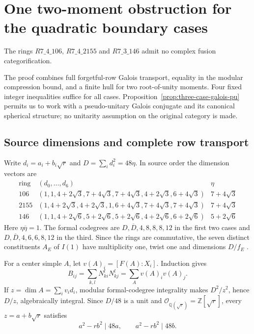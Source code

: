 \section{One two-moment obstruction for the quadratic boundary cases}
\label{sec:quadratic-center-trace}

\begin{theorem}\label{thm:quadratic-center-trace}
The rings $R7\_4\_106$, $R7\_4\_2155$ and $R7\_3\_146$
admit no complex fusion categorification.
\end{theorem}

The proof combines full forgetful-row Galois transport, equality in the
modular compression bound, and a finite hull for two root-of-unity
moments. Four fixed integer inequalities suffice for all cases.
Proposition~\ref{prop:three-case-galois-pu} permits us to work with a
pseudo-unitary Galois conjugate and its canonical spherical structure;
no unitarity assumption on the original category is made.

\subsection{Source dimensions and complete row transport}
Write $d_i=a_i+b_i\sqrt r$ and $D=\sum_i d_i^2=48\eta$.
In source order the dimension vectors are
{\small
\[
\begin{array}{c|l|c}
\text{ring}&(d_0,\ldots,d_6)&\eta\\\hline
106&(1,1,4+2\sqrt3,7+4\sqrt3,7+4\sqrt3,4+2\sqrt3,6+4\sqrt3)&7+4\sqrt3\\
2155&(1,4+2\sqrt3,4+2\sqrt3,1,6+4\sqrt3,7+4\sqrt3,7+4\sqrt3)&7+4\sqrt3\\
146&(1,1,4+2\sqrt6,5+2\sqrt6,5+2\sqrt6,4+2\sqrt6,6+2\sqrt6)&5+2\sqrt6
\end{array}
\]
}
Here $\eta\overline\eta=1$. The formal codegrees are
$D,\overline D,4,8,8,8,12$ in the first two cases and
$D,\overline D,4,6,6,8,12$ in the third. Since the rings are
commutative, the seven distinct constituents $A_E$ of $I(1)$ have
multiplicity one, twist one and dimensions $D/f_E$
\cite[Theorems~2.5 and~2.13]{OstrikRank3}.

For a center simple $A$, let $v(A)_i=[F(A):X_i]$. Induction gives
\begin{equation}\label{eq:quadratic-center-gram}
 B_{ij}=\sum_{k,l}N_{ki}^lN_{kj}^l
       =\sum_A v(A)_i v(A)_j.
\end{equation}
If $z=\dim A=\sum_i v_i d_i$, modular formal-codegree integrality
makes $D^2/z^2$, hence $D/z$, algebraically integral. Since
$D/48$ is a unit and $\mathcal O_{\mathbb Q(\sqrt r)}=\mathbb Z[\sqrt r]$,
every $z=a+b\sqrt r$ satisfies
\begin{equation}\label{eq:quadratic-center-divisibility}
             a^2-rb^2\mid48a,\qquad a^2-rb^2\mid48b.
\end{equation}

